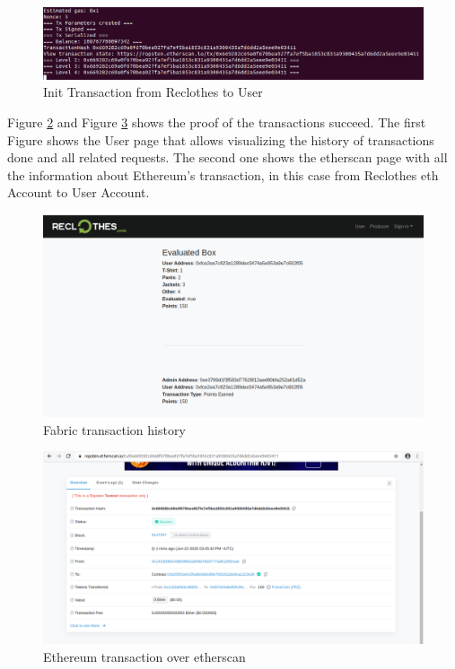 \begin{figure}[h!]
	\centering
    \includegraphics[totalheight=3cm]{img/test/test1/performed-tx-RU.png}
	\caption{Init Transaction from Reclothes to User}
	\label{fig:tx-reclothes-user}
\end{figure}

Figure \ref{fig:fabric-tx} and Figure \ref{fig:eth-tx} shows the proof of the transactions succeed. 
The first Figure shows the User page that allows visualizing the history of transactions done and all related 
requests. The second one shows the etherscan page with all the information about Ethereum's transaction, in 
this case from Reclothes eth Account to User Account.

\begin{figure}[h!]
	\centering
    \includegraphics[totalheight=7cm]{img/test/test1/fabrix-tx.png}
	\caption{Fabric transaction history}
	\label{fig:fabric-tx}
\end{figure}

\begin{figure}[h!]
	\centering
    \includegraphics[totalheight=7cm]{img/test/test1/etherscan.png}
	\caption{Ethereum transaction over etherscan}
	\label{fig:eth-tx}
\end{figure}

